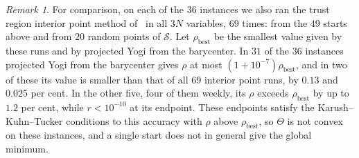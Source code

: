 \documentclass[11pt]{article}
\theoremstyle{plain}
\theoremstyle{remark}
\newtheorem{remark}[theorem]{Remark}
\numberwithin{equation}{section}
\begin{document}
\begin{remark}\label{t-rem-interior}
For comparison, on each of the $36$ instances we also ran the trust region
interior point method of~\cite{1999Byrd_Hribar_Nocedal} in all $3N$
variables, $69$ times: from the $49$ starts above and from $20$ random points
of $\mathcal{S}$. Let $\rho_{\mathrm{best}}$ be the smallest value given by
these runs and by projected Yogi from the barycenter. In $31$ of the $36$
instances projected Yogi from the barycenter gives $\rho$ at most
$(1+10^{-7})\rho_{\mathrm{best}}$, and in two of these its value is smaller
than that of all $69$ interior point runs, by $0.13$ and $0.025$ per cent. In
the other five, four of them weekly, its $\rho$ exceeds $\rho_{\mathrm{best}}$
by up to $1.2$ per cent, while $r<10^{-10}$ at its endpoint. These endpoints
satisfy the Karush--Kuhn--Tucker conditions to this accuracy with $\rho$ above
$\rho_{\mathrm{best}}$, so $\Theta$ is not convex on these instances, and a
single start does not in general give the global minimum.
\end{remark}
%
\end{document}
